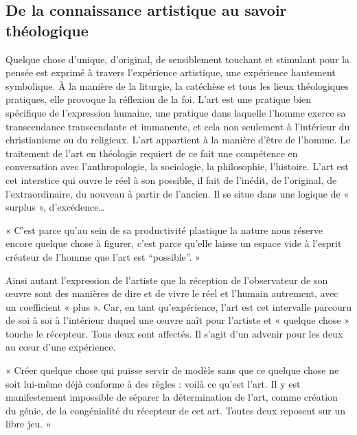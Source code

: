 \subsection{De la connaissance artistique au savoir théologique}

Quelque chose d’unique, d’original, de sensiblement touchant et stimulant pour la pensée est exprimé à travers l’expérience artistique, une expérience hautement symbolique. À la manière de la liturgie, la catéchèse et tous les lieux théologiques pratiques, elle provoque la réflexion de la foi. L’art est une pratique bien spécifique de l’expression humaine, une pratique dans laquelle l’homme exerce sa transcendance transcendante et immanente, et cela non seulement à l’intérieur du christianisme ou du religieux. L’art appartient à la manière d’être de l’homme. Le traitement de l’art en théologie requiert de ce fait une compétence en conversation avec l’anthropologie, la sociologie, la philosophie, l’histoire. L’art est cet interstice qui ouvre le réel à son possible, il fait de l’inédit, de l’original, de l’extraordinaire, du nouveau à partir de l’ancien. Il se situe dans une logique de « surplus », d’excédence…

\vspace{0.24cm}
{\footnotesize « C’est parce qu’au sein de sa productivité plastique la nature nous réserve encore quelque chose à figurer, c’est parce qu’elle laisse un espace vide à l’esprit créateur de l’homme que l’art est “possible”. »}
\vspace{0.31cm}

Ainsi autant l’expression de l’artiste que la réception de l’observateur de son œuvre sont des manières de dire et de vivre le réel et l’humain autrement, avec un coefficient « plus ». Car, en tant qu’expérience, l’art est cet intervalle parcouru de soi à soi à l’intérieur duquel une œuvre naît pour l’artiste et « quelque chose » touche le récepteur. Tous deux sont affectés. Il s’agit d’un advenir pour les deux au cœur d’une expérience.

\vspace{0.24cm}
{\footnotesize « Créer quelque chose qui puisse servir de modèle sans que ce quelque chose ne soit lui-même déjà conforme à des règles : voilà ce qu’est l’art. Il y est manifestement impossible de séparer la détermination de l’art, comme création du génie, de la congénialité du récepteur de cet art. Toutes deux reposent sur un libre jeu. »}
\vspace{0.31cm}

